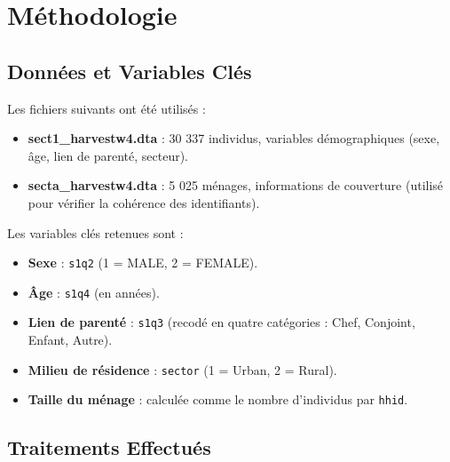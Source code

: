 \documentclass[
  11pt,
]{article}
\begin{document}
\section{Méthodologie}\label{muxe9thodologie}

\subsection{Données et Variables
Clés}\label{donnuxe9es-et-variables-cluxe9s}

Les fichiers suivants ont été utilisés :

\begin{itemize}
\item
  \textbf{sect1\_harvestw4.dta} : 30 337 individus, variables
  démographiques (sexe, âge, lien de parenté, secteur).
\item
  \textbf{secta\_harvestw4.dta} : 5 025 ménages, informations de
  couverture (utilisé pour vérifier la cohérence des identifiants).
\end{itemize}

Les variables clés retenues sont :

\begin{itemize}
\item
  \textbf{Sexe} : \texttt{s1q2} (1 = MALE, 2 = FEMALE).
\item
  \textbf{Âge} : \texttt{s1q4} (en années).
\item
  \textbf{Lien de parenté} : \texttt{s1q3} (recodé en quatre catégories
  : Chef, Conjoint, Enfant, Autre).
\item
  \textbf{Milieu de résidence} : \texttt{sector} (1 = Urban, 2 = Rural).
\item
  \textbf{Taille du ménage} : calculée comme le nombre d'individus par
  \texttt{hhid}.
\end{itemize}

\subsection{Traitements Effectués}\label{traitements-effectuuxe9s}
\end{document}
